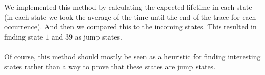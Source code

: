 We implemented this method by calculating the expected lifetime in each state (in each state we took the average of the time until the end of the trace for each occurrence). And then we compared this to the incoming states. This resulted in finding state $1$ and $39$ as jump states.\\
\\
Of course, this method should mostly be seen as a heuristic for finding interesting states rather than a way to prove that these states are jump states.